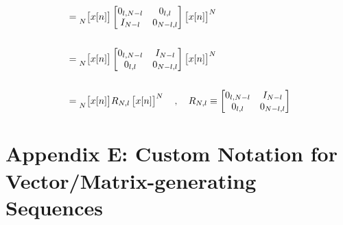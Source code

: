 \documentclass{article}
\begin{document}
\begin{align*}
             &=\prescript{}{N}{\begin{bmatrix} x[n] \end{bmatrix}}\begin{bmatrix}
                                                                        0_{l, N - l} & 0_{    l, l} \\
                                                                        I_{   N - l} & 0_{N - l, l}
                                                                    \end{bmatrix}\begin{bmatrix} x[n] \end{bmatrix}^{N} \\ \\
             &=\prescript{}{N}{\begin{bmatrix} x[n] \end{bmatrix}}\begin{bmatrix}
                                                                        0_{l, N - l} & I_{N - l} \\
                                                                        0_{l,     l} & 0_{N - l, l}
                                                                    \end{bmatrix}\begin{bmatrix} x[n] \end{bmatrix}^{N} \\ \\
             &=\prescript{}{N}{\begin{bmatrix} x[n] \end{bmatrix}}R_{N, l}\begin{bmatrix} x[n] \end{bmatrix}^{N} \quad, \quad R_{N, l} \equiv \begin{bmatrix}
                                                                                                                                                    0_{l, N - l} & I_{N - l} \\
                                                                                                                                                    0_{l,     l} & 0_{N - l, l}
                                                                                                                                                \end{bmatrix}
  \end{align*}

\newpage
\section*{Appendix E: Custom Notation for Vector/Matrix-generating Sequences}
\end{document}
